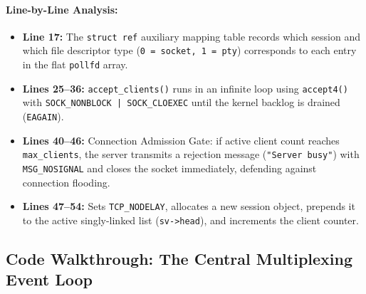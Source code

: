 \paragraph{Line-by-Line Analysis:}
\begin{itemize}[leftmargin=1.5em]
    \item \textbf{Line 17:} The \texttt{struct ref} auxiliary mapping table records which session and which file descriptor type (\texttt{0 = socket, 1 = pty}) corresponds to each entry in the flat \texttt{pollfd} array.
    \item \textbf{Lines 25--36:} \texttt{accept\_clients()} runs in an infinite loop using \texttt{accept4()} with \texttt{SOCK\_NONBLOCK | SOCK\_CLOEXEC} until the kernel backlog is drained (\texttt{EAGAIN}).
    \item \textbf{Lines 40--46:} Connection Admission Gate: if active client count reaches \texttt{max\_clients}, the server transmits a rejection message (\texttt{"Server busy"}) with \texttt{MSG\_NOSIGNAL} and closes the socket immediately, defending against connection flooding.
    \item \textbf{Lines 47--54:} Sets \texttt{TCP\_NODELAY}, allocates a new session object, prepends it to the active singly-linked list (\texttt{sv->head}), and increments the client counter.
\end{itemize}

\subsection{Code Walkthrough: The Central Multiplexing Event Loop}

